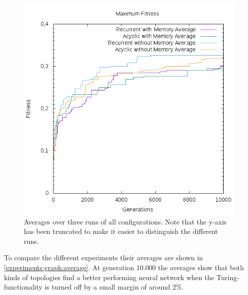 \begin{figure}[ht]
	\includegraphics[width=\textwidth]{figures/averages.png}
	\caption{Averages over three runs of all configurations. Note that the y-axis has been truncated to make it easier to distinguish the different runs.}
	\label{experiments:graph:average}
\end{figure}

\newpar To compare the different experiments their averages are shown in \autoref{experiments:graph:average}. At generation 10.000 the averages show that both kinds of topologies find a better performing neural network when the Turing-functionality is turned off by a small margin of around 2\%.

\clearpage